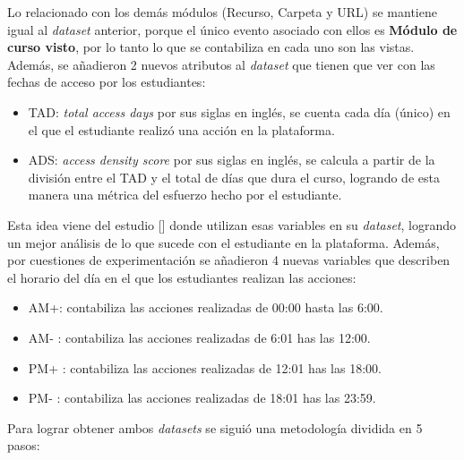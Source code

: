 Lo relacionado con los demás módulos (Recurso, Carpeta y URL) se mantiene igual al \textit{dataset} anterior, porque el único evento asociado con ellos es \textbf{Módulo de curso visto}, por lo tanto lo que se contabiliza en cada uno son las vistas. Además, se añadieron 2 nuevos atributos al \textit{dataset} que tienen que ver con las fechas de acceso por los estudiantes:
\begin{itemize}
    \item TAD: \textit{total access days} por sus siglas en inglés, se cuenta cada día (único) en el que el estudiante realizó una acción en la plataforma.
    \item ADS: \textit{access density score} por sus siglas en inglés, se calcula a partir de la división entre el TAD y el total de días que dura el curso, logrando de esta manera una métrica del esfuerzo hecho por el estudiante.
\end{itemize}

Esta idea viene del estudio [\cite{Jennifer}] donde utilizan esas variables en su \textit{dataset}, logrando un mejor análisis de lo que sucede con el estudiante en la plataforma. Además, por cuestiones de experimentación se añadieron 4 nuevas variables que describen el horario del día en el que los estudiantes realizan las acciones: 

\begin{itemize}
    \item AM+: contabiliza las acciones realizadas de 00:00 hasta las 6:00.
    \item AM- : contabiliza las acciones realizadas de 6:01 has las 12:00.
    \item PM+ : contabiliza las acciones realizadas de 12:01 has las 18:00.
    \item PM- : contabiliza las acciones realizadas de 18:01 has las 23:59.
\end{itemize}

Para lograr obtener ambos \textit{datasets} se siguió una metodología dividida en 5 pasos:

